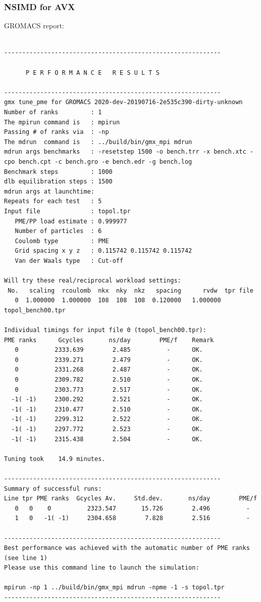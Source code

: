\subsubsection{NSIMD for AVX}
GROMACS report: \\
\begin{lstlisting}[frame=single]

------------------------------------------------------------

      P E R F O R M A N C E   R E S U L T S

------------------------------------------------------------
gmx tune_pme for GROMACS 2020-dev-20190716-2e535c390-dirty-unknown
Number of ranks         : 1
The mpirun command is   : mpirun
Passing # of ranks via  : -np
The mdrun  command is   : ../build/bin/gmx_mpi mdrun
mdrun args benchmarks   : -resetstep 1500 -o bench.trr -x bench.xtc -cpo bench.cpt -c bench.gro -e bench.edr -g bench.log 
Benchmark steps         : 1000
dlb equilibration steps : 1500
mdrun args at launchtime: 
Repeats for each test   : 5
Input file              : topol.tpr
   PME/PP load estimate : 0.999977
   Number of particles  : 6
   Coulomb type         : PME
   Grid spacing x y z   : 0.115742 0.115742 0.115742
   Van der Waals type   : Cut-off

Will try these real/reciprocal workload settings:
 No.   scaling  rcoulomb  nkx  nky  nkz   spacing      rvdw  tpr file
   0  1.000000  1.000000  108  108  108  0.120000   1.000000  topol_bench00.tpr

Individual timings for input file 0 (topol_bench00.tpr):
PME ranks      Gcycles       ns/day        PME/f    Remark
   0          2333.639        2.485          -      OK.
   0          2339.271        2.479          -      OK.
   0          2331.268        2.487          -      OK.
   0          2309.782        2.510          -      OK.
   0          2303.773        2.517          -      OK.
  -1( -1)     2300.292        2.521          -      OK.
  -1( -1)     2310.477        2.510          -      OK.
  -1( -1)     2299.312        2.522          -      OK.
  -1( -1)     2297.772        2.523          -      OK.
  -1( -1)     2315.438        2.504          -      OK.

Tuning took    14.9 minutes.

------------------------------------------------------------
Summary of successful runs:
Line tpr PME ranks  Gcycles Av.     Std.dev.       ns/day        PME/f
   0   0    0          2323.547       15.726        2.496          -  
   1   0   -1( -1)     2304.658        7.828        2.516          -  

------------------------------------------------------------
Best performance was achieved with the automatic number of PME ranks (see line 1)
Please use this command line to launch the simulation:

mpirun -np 1 ../build/bin/gmx_mpi mdrun -npme -1 -s topol.tpr  
------------------------------------------------------------

\end{lstlisting}

